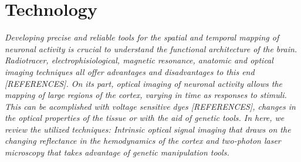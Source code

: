 \chapter{Technology}
\label{cap:Technology}

\textit{Developing precise and reliable tools for the spatial and temporal mapping of neuronal activity is crucial to understand the functional architecture of the brain. Radiotracer, electrophisiological, magnetic resonance, anatomic and optical imaging techniques all offer advantages and disadvantages to this end [REFERENCES]. On its part, optical imaging of neuronal activity allows the mapping of large regions of the cortex, varying in time as responses to stimuli. This can be acomplished with voltage sensitive dyes [REFERENCES], changes in the optical properties of the tissue or with the aid of genetic tools. In here, we review the utilized techniques: Intrinsic optical signal imaging that draws on the changing reflectance in the hemodynamics of the cortex and two-photon laser microscopy that takes advantage of genetic manipulation tools.}





\cleardoublepage
